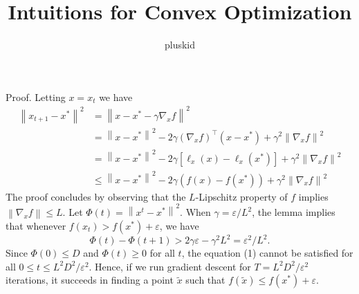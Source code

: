 \documentclass{scrartcl}
\title{Intuitions for Convex Optimization}
\author{pluskid}
\begin{document}
Proof. Letting $x=x_{t}$ we have
$$
\begin{aligned}
\left\|x_{t+1}-x^{*}\right\|^{2} &=\left\|x-x^{*}-\gamma \nabla_{x} f\right\|^{2} \\
&=\left\|x-x^{*}\right\|^{2}-2 \gamma\left(\nabla_{x} f\right)^{\top}\left(x-x^{*}\right)+\gamma^{2}\left\|\nabla_{x} f\right\|^{2} \\
&=\left\|x-x^{*}\right\|^{2}-2 \gamma\left[\ell_{x}(x)-\ell_{x}\left(x^{*}\right)\right]+\gamma^{2}\left\|\nabla_{x} f\right\|^{2} \\
& \leq\left\|x-x^{*}\right\|^{2}-2 \gamma\left(f(x)-f\left(x^{*}\right)\right)+\gamma^{2}\left\|\nabla_{x} f\right\|^{2}
\end{aligned}
$$
The proof concludes by observing that the $L$-Lipschitz property of $f$ implies $\left\|\nabla_{x} f\right\| \leq L$.
Let $\Phi(t)=\left\|x^{t}-x^{*}\right\|^{2}$. When $\gamma=\varepsilon / L^{2}$, the lemma implies that whenever $f\left(x_{t}\right)>f\left(x^{*}\right)+\varepsilon$, we have
$$
\Phi(t)-\Phi(t+1)>2 \gamma \varepsilon-\gamma^{2} L^{2}=\varepsilon^{2} / L^{2} .
$$
Since $\Phi(0) \leq D$ and $\Phi(t) \geq 0$ for all $t$, the equation (1) cannot be satisfied for all $0 \leq t \leq L^{2} D^{2} / \varepsilon^{2}$. Hence, if we run gradient descent for $T=L^{2} D^{2} / \varepsilon^{2}$ iterations, it succeeds in finding a point $\tilde{x}$ such that $f(\tilde{x}) \leq f\left(x^{*}\right)+\varepsilon$.
\end{document}
